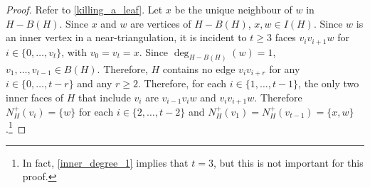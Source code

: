 \documentclass[a4paper,UKenglish,cleveref, autoref, thm-restate]{lipics-v2021}
\begin{document}
\begin{proof}
  Refer to \cref{killing_a_leaf}.
  Let $x$ be the unique neighbour of $w$ in $H-B(H)$. Since $x$ and $w$ are vertices of $H-B(H)$, $x,w\in I(H)$.  Since $w$ is an inner vertex in a near-triangulation, it is incident to $t\ge 3$ faces $v_iv_{i+1}w$ for $i\in\{0,\ldots,v_{t}\}$, with $v_0=v_t=x$.  Since $\deg_{H-B(H)}(w)=1$, $v_1,\ldots,v_{t-1}\in B(H)$.  Therefore, $H$ contains no edge $v_i v_{i+r}$ for any $i\in\{0,\ldots,t-r\}$ and any $r\ge 2$.  Therefore, for each $i\in\{1,\ldots,t-1\}$, the only two inner faces of $H$ that include $v_i$ are $v_{i-1}v_iw$ and $v_iv_{i+1}w$.  Therefore $N^+_H(v_i)=\{w\}$ for each $i\in\{2,\ldots,t-2\}$ and $N^+_H(v_1)=N^+_H(v_{t-1})=\{x,w\}$.\footnote{In fact, \cref{inner_degree_1} implies that $t=3$, but this is not important for this proof.}


\end{proof}
\end{document}
